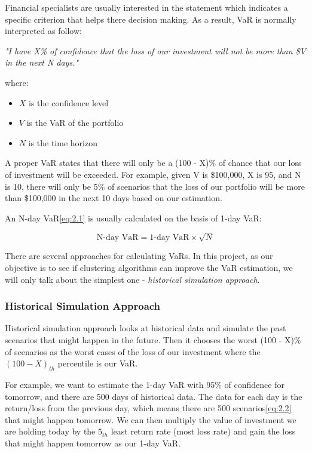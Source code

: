 \documentclass[11pt]{article} %
\theoremstyle{plain}
\theoremstyle{definition}
\begin{document}
Financial specialists are usually interested in the statement which indicates a specific criterion that helps there decision making. As a result, VaR is normally interpreted as follow:

\textsl{"I have X\% of confidence that the loss of our investment will not be more than \$V in the next N days."}

{
  \footnotesize
  where:
  \begin{itemize}[label=-, leftmargin=4em, itemsep=0.1em]
    \item ${X}$ is the confidence level
    \item ${V}$ is the VaR of the portfolio
    \item ${N}$ is the time horizon
  \end{itemize}
}

A proper VaR states that there will only be a (100 - X)\% of chance that our loss of investment will be exceeded. For example, given V is \$100,000, X is 95, and N is 10, there will only be 5\% of scenarios that the loss of our portfolio will be more than \$100,000 in the next 10 days based on our estimation.

An N-day VaR\eqref{eq:2.1} is usually calculated on the basis of 1-day VaR:

\begin{equation}
  \label{eq:2.1}
  \tag{2.1}
  {\text{N-day VaR} = \text{1-day VaR} \times \sqrt{N}}
\end{equation}

There are several approaches for calculating VaRs. In this project, as our objective is to see if clustering algorithms can improve the VaR estimation, we will only talk about the simplest one - \textsl{historical simulation approach}\cite{john/ofaod:2017}.

\subsubsection{Historical Simulation Approach}

Historical simulation approach looks at historical data and simulate the past  scenarios that might happen in the future. Then it chooses the worst (100 - X)\% of scenarios as the worst cases of the loss of our investment where the $(100 - X)_{th}$ percentile is our VaR.

For example, we want to estimate the 1-day VaR with 95\% of confidence for tomorrow, and there are 500 days of historical data. The data for each day is the return/loss from the previous day, which means there are 500 scenarios\eqref{eq:2.2} that might happen tomorrow. We can then multiply the value of investment we are holding today by the $5_{th}$ least return rate (most loss rate) and gain the loss that might happen tomorrow as our 1-day VaR\cite{john/ofaod:2017}.
\end{document}
